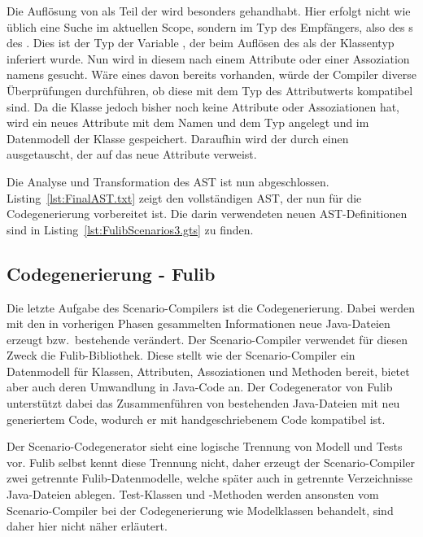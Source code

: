 Die Auflösung von  als Teil der  wird besonders gehandhabt.
Hier erfolgt nicht wie üblich eine Suche im aktuellen Scope,
sondern im Typ des Empfängers, also des s des .
Dies ist der Typ der Variable , der beim Auflösen des  als der Klassentyp  inferiert wurde.
Nun wird in diesem nach einem Attribute oder einer Assoziation namens  gesucht.
Wäre eines davon bereits vorhanden, würde der Compiler diverse Überprüfungen durchführen,
ob diese mit dem Typ des Attributwerts kompatibel sind.
Da die Klasse  jedoch bisher noch keine Attribute oder Assoziationen hat,
wird ein neues Attribute mit dem Namen  und dem Typ  angelegt
und im Datenmodell der Klasse  gespeichert.
Daraufhin wird der  durch einen  ausgetauscht,
der auf das neue Attribute verweist.

Die Analyse und Transformation des AST ist nun abgeschlossen.
Listing~\ref{lst:FinalAST.txt} zeigt den vollständigen AST, der nun für die Codegenerierung vorbereitet ist.
Die darin verwendeten neuen AST-Definitionen sind in Listing~\ref{lst:FulibScenarios3.gts} zu finden.



\subsection{Codegenerierung - Fulib}\label{subsec:codegen-fulib}

Die letzte Aufgabe des Scenario-Compilers ist die Codegenerierung.
Dabei werden mit den in vorherigen Phasen gesammelten Informationen neue Java-Dateien erzeugt bzw.\ bestehende verändert.
Der Scenario-Compiler verwendet für diesen Zweck die Fulib\cite{fulib}-Bibliothek.
Diese stellt wie der Scenario-Compiler ein Datenmodell für Klassen, Attributen, Assoziationen und Methoden bereit,
bietet aber auch deren Umwandlung in Java-Code an.
Der Codegenerator von Fulib unterstützt dabei das Zusammenführen von bestehenden Java-Dateien mit neu generiertem Code,
wodurch er mit handgeschriebenem Code kompatibel ist.

Der Scenario-Codegenerator sieht eine logische Trennung von Modell und Tests vor.
Fulib selbst kennt diese Trennung nicht, daher erzeugt der Scenario-Compiler zwei getrennte Fulib-Datenmodelle, welche später auch in getrennte Verzeichnisse Java-Dateien ablegen.
Test-Klassen und -Methoden werden ansonsten vom Scenario-Compiler bei der Codegenerierung wie Modelklassen behandelt,
sind daher hier nicht näher erläutert.

